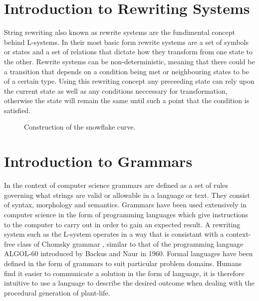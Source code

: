 \section{Introduction to Rewriting Systems}

\begin{flushleft}

String rewriting also known as rewrite systems are the fundimental concept behind L-systems. In their most basic form rewrite systems are a set of symbols or states and a set of relations that dictate how they transform from one state to the other. Rewrite systems can be non-deterministic, meaning that there could be a transition that depends on a condition being met or neighbouring states to be of a certain type. Using this rewriting concept any preceeding state can rely upon the current state as well as any conditions neccessary for transformation, otherwise the state will remain the same until such a point that the condition is satisfied. 

\begin{figure}[htbp]
	{\centering
		\setlength{\fboxrule}{1pt}
		\vspace{7px}
		\caption{Construction of the snowflake curve\cite{prusinkiewicz2013lindenmayer}.} \label{snowflake curve}
	}
\end{figure}
\FloatBarrier



\end{flushleft}

\section{Introduction to Grammars}

\begin{flushleft}

In the context of computer science grammars are defined as a set of rules governing what strings are valid or allowable in a language or text. They consist of syntax, morphology and semantics. Grammars have been used extensively in computer science in the form of programming languages which give instructions to the computer to carry out in order to gain an expected result. A rewriting system such as the L-system operates in a way that is consistant with a context-free class of Chomsky grammar \cite{chomsky1956three}, similar to that of the programming language ALGOL-60 introduced by Backus and Naur in  1960\cite{backus1960report}. Formal languages have been defined in the form of grammars to suit particular problem domains. Humans find it easier to communicate a solution in the form of language, it is therefore intuitive to use a language to describe the desired outcome when dealing with the procedural generation of plant-life.

\end{flushleft}

